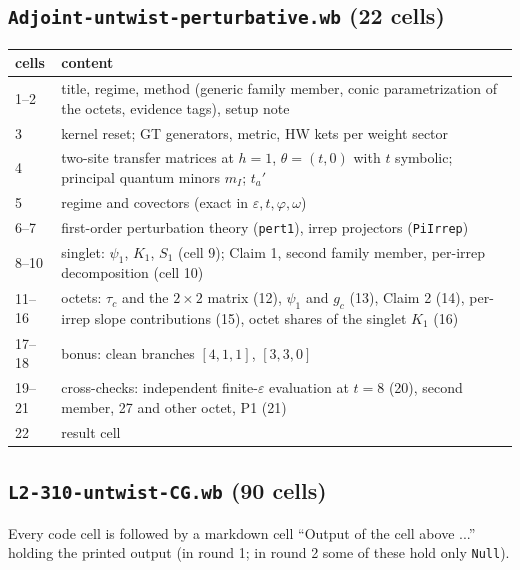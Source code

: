\documentclass[10pt]{article}
\newcommand{\nb}[1]{\texttt{#1}}
\begin{document}
\subsection{\nb{Adjoint-\allowbreak{}untwist-\allowbreak{}perturbative.\allowbreak{}wb} (22 cells)}\label{sec:cellsB}

\begin{center}\small\setlength{\tabcolsep}{3pt}\begin{longtable}{@{}lp{11.5cm}@{}}\toprule
\textbf{cells} & \textbf{content} \\\midrule\endhead
1--2 & title, regime, method (generic family member, conic parametrization of the octets, evidence tags), setup note \\
3 & kernel reset; GT generators, metric, HW kets per weight sector \\
4 & two-site transfer matrices at $h=1$, $\theta=(t,0)$ with $t$ symbolic; principal quantum minors $m_I$; $t_a'$ \\
5 & regime and covectors (exact in $\varepsilon,t,\varphi,\omega$) \\
6--7 & first-order perturbation theory (\nb{pert1}), irrep projectors (\nb{PiIrrep}) \\
8--10 & singlet: $\psi_1$, $K_1$, $S_1$ (cell 9); Claim 1, second family member, per-irrep decomposition (cell 10) \\
11--16 & octets: $\tau_c$ and the $2\times2$ matrix (12), $\psi_1$ and $g_c$ (13), Claim 2 (14), per-irrep slope contributions (15), octet shares of the singlet $K_1$ (16) \\
17--18 & bonus: clean branches $[4,1,1]$, $[3,3,0]$ \\
19--21 & cross-checks: independent finite-$\varepsilon$ evaluation at $t=8$ (20), second member, 27 and other octet, P1 (21) \\
22 & result cell \\
\bottomrule\end{longtable}\end{center}

\subsection{\nb{L2-\allowbreak{}310-\allowbreak{}untwist-\allowbreak{}CG.\allowbreak{}wb} (90 cells)}\label{sec:cellsC}

Every code cell is followed by a markdown cell ``Output of the cell above ...'' holding the printed output (in round 1; in round 2 some of these hold only \nb{Null}).
\end{document}
